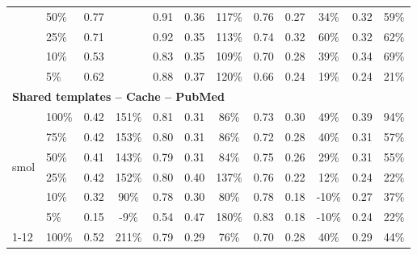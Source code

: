 \begin{longtable}{llcccccccccc}
 & 50\% & 0.77 & \cellcolor{tablegreen!100}\textcolor{white}{365\%} & 0.91 & 0.36 & \cellcolor{tablegreen!33}117\% & 0.76 & 0.27 & \cellcolor{tablegreen!10}34\% & 0.32 & \cellcolor{tablegreen!17}59\% \\
 & 25\% & 0.71 & \cellcolor{tablegreen!93}\textcolor{white}{325\%} & 0.92 & 0.35 & \cellcolor{tablegreen!32}113\% & 0.74 & 0.32 & \cellcolor{tablegreen!17}60\% & 0.32 & \cellcolor{tablegreen!18}62\% \\
 & 10\% & 0.53 & \cellcolor{tablegreen!61}\textcolor{white}{215\%} & 0.83 & 0.35 & \cellcolor{tablegreen!31}109\% & 0.70 & 0.28 & \cellcolor{tablegreen!11}39\% & 0.34 & \cellcolor{tablegreen!20}69\% \\
 & 5\% & 0.62 & \cellcolor{tablegreen!78}\textcolor{white}{274\%} & 0.88 & 0.37 & \cellcolor{tablegreen!34}120\% & 0.66 & 0.24 & \cellcolor{tablegreen!5}19\% & 0.24 & \cellcolor{tablegreen!6}21\% \\
\midrule
\multicolumn{12}{l}{\textbf{Shared templates -- Cache -- PubMed}} \\
\multirow{6}{*}{smol} & 100\% & 0.42 & \cellcolor{tablegreen!43}151\% & 0.81 & 0.31 & \cellcolor{tablegreen!25}86\% & 0.73 & 0.30 & \cellcolor{tablegreen!14}49\% & 0.39 & \cellcolor{tablegreen!27}94\% \\
 & 75\% & 0.42 & \cellcolor{tablegreen!44}153\% & 0.80 & 0.31 & \cellcolor{tablegreen!25}86\% & 0.72 & 0.28 & \cellcolor{tablegreen!11}40\% & 0.31 & \cellcolor{tablegreen!16}57\% \\
 & 50\% & 0.41 & \cellcolor{tablegreen!41}143\% & 0.79 & 0.31 & \cellcolor{tablegreen!24}84\% & 0.75 & 0.26 & \cellcolor{tablegreen!8}29\% & 0.31 & \cellcolor{tablegreen!16}55\% \\
 & 25\% & 0.42 & \cellcolor{tablegreen!43}152\% & 0.80 & 0.40 & \cellcolor{tablegreen!39}137\% & 0.76 & 0.22 & \cellcolor{tablegreen!3}12\% & 0.24 & \cellcolor{tablegreen!6}22\% \\
 & 10\% & 0.32 & \cellcolor{tablegreen!26}90\% & 0.78 & 0.30 & \cellcolor{tablegreen!23}80\% & 0.78 & 0.18 & \cellcolor[HTML]{E8A0A0}-10\% & 0.27 & \cellcolor{tablegreen!10}37\% \\
 & 5\% & 0.15 & \cellcolor[HTML]{E8A0A0}-9\% & 0.54 & 0.47 & \cellcolor{tablegreen!51}180\% & 0.83 & 0.18 & \cellcolor[HTML]{E8A0A0}-10\% & 0.24 & \cellcolor{tablegreen!6}22\% \\
\cmidrule(l){1-12}
\multirow{6}{*}{qwen} & 100\% & 0.52 & \cellcolor{tablegreen!60}211\% & 0.79 & 0.29 & \cellcolor{tablegreen!22}76\% & 0.70 & 0.28 & \cellcolor{tablegreen!11}40\% & 0.29 & \cellcolor{tablegreen!13}44\% \\

\end{longtable}
